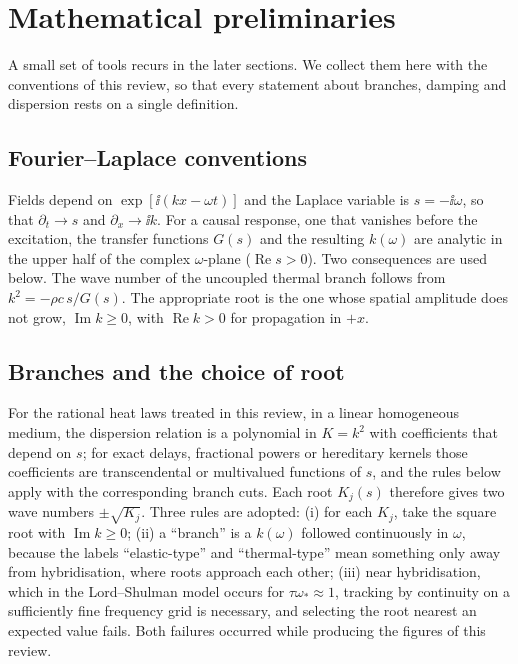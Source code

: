 \section{Mathematical preliminaries}\label{sec:prelim}

A small set of tools recurs in the later sections. We collect them here with the conventions of this review, so that every statement about branches, damping and dispersion rests on a single definition.

\subsection{Fourier--Laplace conventions}
Fields depend on $\exp[\ii(kx-\omega t)]$ and the Laplace variable is $s=-\ii\omega$, so that $\partial_t\to s$ and $\partial_x\to \ii k$. For a causal response, one that vanishes before the excitation, the transfer functions $G(s)$ and the resulting $k(\omega)$ are analytic in the upper half of the complex $\omega$-plane ($\operatorname{Re}s>0$). Two consequences are used below. The wave number of the uncoupled thermal branch follows from $k^2=-\rho c\,s/G(s)$. The appropriate root is the one whose spatial amplitude does not grow, $\operatorname{Im}k\ge0$, with $\operatorname{Re}k>0$ for propagation in $+x$.

\subsection{Branches and the choice of root}
For the rational heat laws treated in this review, in a linear homogeneous medium, the dispersion relation is a polynomial in $K=k^2$ with coefficients that depend on $s$; for exact delays, fractional powers or hereditary kernels those coefficients are transcendental or multivalued functions of $s$, and the rules below apply with the corresponding branch cuts. Each root $K_j(s)$ therefore gives two wave numbers $\pm\sqrt{K_j}$. Three rules are adopted: (i) for each $K_j$, take the square root with $\operatorname{Im}k\ge0$; (ii) a ``branch'' is a $k(\omega)$ followed continuously in $\omega$, because the labels ``elastic-type'' and ``thermal-type'' mean something only away from hybridisation, where roots approach each other; (iii) near hybridisation, which in the Lord--Shulman model occurs for $\tau\omega_*\approx1$, tracking by continuity on a sufficiently fine frequency grid is necessary, and selecting the root nearest an expected value fails. Both failures occurred while producing the figures of this review.

